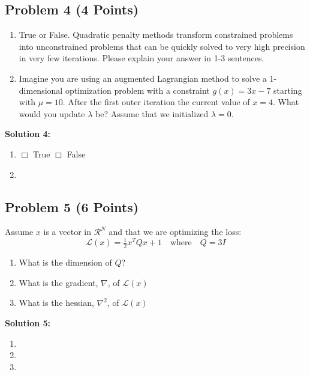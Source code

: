 \documentclass[]{article}
\begin{document}
\subsection*{Problem 4 (4 Points)}
\begin{enumerate}[label=(\alph*)]
    \item True or False. Quadratic penalty methods transform constrained problems into unconstrained problems that can be quickly solved to very high precision in very few iterations. Please explain your answer in 1-3 sentences.
    \item Imagine you are using an augmented Lagrangian method to solve a 1-dimensional optimization problem with a constraint $g(x) = 3x - 7$ starting with $\mu = 10$. After the first outer iteration the current value of $x = 4$. What would you update $\lambda$ be? Assume that we initialized $\lambda = 0$.
    
\end{enumerate}

\textbf{Solution 4:}
\begin{enumerate}[label=(\alph*)]
    \item $\Box$ True \quad \quad $\Box$ False \\
    \item %
\end{enumerate}

\clearpage
\subsection*{Problem 5 (6 Points)}
    Assume $x$ is a vector in $\mathcal{R}^N$ and that we are optimizing the loss:
    $$\mathcal{L}(x) = \tfrac{1}{2}x^TQx + 1 \quad \text{where} \quad Q = 3I$$
\begin{enumerate}[label=(\alph*)]
    \item What is the dimension of $Q$?
    \item What is the gradient, $\nabla$, of $\mathcal{L}(x)$
    \item What is the hessian, $\nabla^2$, of $\mathcal{L}(x)$
\end{enumerate}

\textbf{Solution 5:}
\begin{enumerate}[label=(\alph*)]
    \item %
    \item %
    \item %
\end{enumerate}
\end{document}
